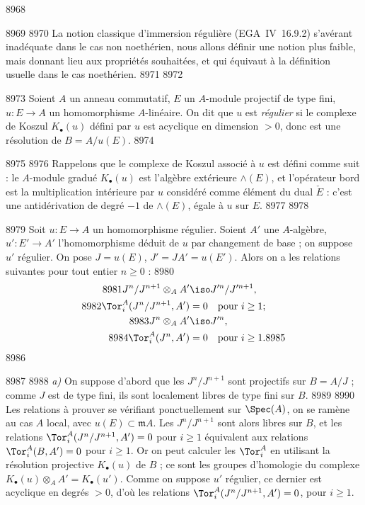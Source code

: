   8968	
  8969	
  8970	La notion classique d'immersion r\'eguli\`ere (EGA~IV~16.9.2) s'av\'erant inad\'equate dans le cas non noeth\'erien, nous allons d\'efinir une notion plus faible, mais donnant lieu aux propri\'et\'es souhait\'ees, et qui \'equivaut \`a la d\'efinition usuelle dans le cas noeth\'erien.
  8971	
  8972	\begin{definition}[1.1]
  8973	Soient $A$ un anneau commutatif, $E$ un $A$-module projectif de type fini, $u: E \to A$ un homomorphisme $A$-lin\'eaire. On dit que $u$ est \emph{r\'egulier} si le complexe de Koszul $K_{\bullet}(u)$ d\'efini par $u$ est acyclique en dimension $> 0$, donc est une r\'esolution de $B = A/u(E)$.
  8974	\end{definition}
  8975	
  8976	Rappelons que le complexe de Koszul associ\'e \`a $u$ est d\'efini comme suit : le $A$-module gradu\'e $K_{\bullet}(u)$ est l'alg\`ebre ext\'erieure $\wedge(E)$, et l'op\'erateur bord est la multiplication int\'erieure par $u$ consid\'er\'e comme \'el\'ement du dual $\check{E}$ : c'est une antid\'erivation de degr\'e $-1$ de $\wedge(E)$, \'egale \`a $u$ sur $E$.
  8977	
  8978	\begin{lemme}[1.2]
  8979	Soit $u: E \to A$ un homomorphisme r\'egulier. Soient $A'$ une $A$-alg\`ebre, $u': E' \to A'$ l'homomorphisme d\'eduit de $u$ par changement de base ; on suppose $u'$ r\'egulier. On pose $J = u(E)$, $J' = JA' = u(E')$. Alors on a les relations suivantes pour tout entier $n \geq 0$ :
  8980	\begin{align}
  8981	\label{eq:1.2.1} J^n/J^{n+1} \otimes_A A' &\iso J'^n/J'^{n+1}, \\
  8982	\label{eq:1.2.2} \Tor_i^A(J^n/J^{n+1}, A') &= 0 \quad \text{pour } i \geq 1 ; \\
  8983	\label{eq:1.2.3} J^n \otimes_A A' &\iso J'^n, \\
  8984	\label{eq:1.2.4} \Tor_i^A(J^n, A') &= 0 \quad \text{pour } i \geq 1.
  8985	\end{align}
  8986	\end{lemme}
  8987	
  8988	\emph{a)} On suppose d'abord que les $J^n/J^{n+1}$ sont projectifs sur $B = A/J$ ; comme $J$ est de type fini, ils sont localement libres de type fini sur $B$.
  8989	
  8990	Les relations \`a prouver se v\'erifiant ponctuellement sur $\Spec(A)$, on se ram\`ene au cas $A$ local, avec $u(E) \subset \mathfrak{m} A$. Les $J^n/J^{n+1}$ sont alors libres sur $B$, et les relations $\Tor_i^A(J^n/J^{n+1}, A') = 0$ pour $i \geq 1$ \'equivalent aux relations $\Tor_i^A(B, A') = 0$ pour $i \geq 1$. Or on peut calculer les $\Tor_i^A$ en utilisant la r\'esolution projective $K_{\bullet}(u)$ de $B$ ; ce sont les groupes d'homologie du complexe $K_{\bullet}(u) \otimes_A A' = K_{\bullet}(u')$. Comme on suppose $u'$ r\'egulier, ce dernier est acyclique en degr\'es $> 0$, d'o\`u les relations $\Tor_i^A(J^n/J^{n+1}, A') = 0$, pour $i \geq 1$.
